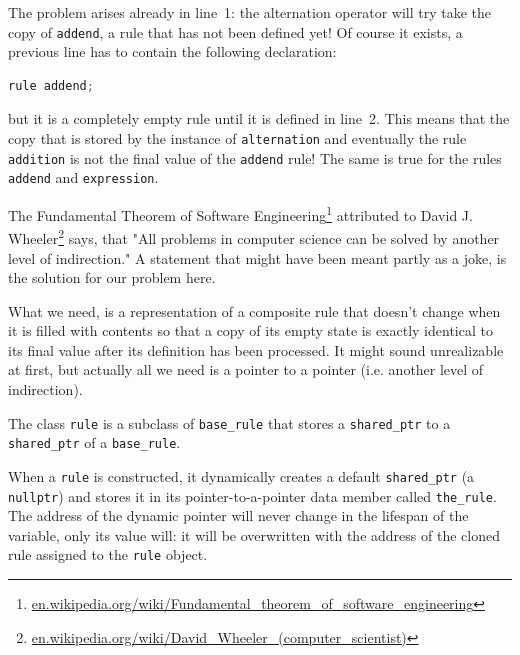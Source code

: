 \documentclass[12pt]{article}
\begin{document}
The problem arises already in line~1: the alternation operator will try take the copy of \texttt{addend},
a rule that has not been defined yet! Of course it exists, a previous line has to contain the following
declaration:

\begin{center}
	\begin{minipage}[h]{0.5\textwidth}
		\begin{lstlisting}[language=C++, breaklines=true]
rule addend;
		\end{lstlisting}
	\end{minipage}
\end{center}

but it is a completely empty rule until it is defined in line~2. This means that the copy that is stored by
the instance of \texttt{alternation} and eventually the rule \texttt{addition} is not the final value of the
\texttt{addend} rule! The same is true for the rules \texttt{addend} and \texttt{expression}.

The Fundamental Theorem of Software
Engineering\footnote{\href{http://en.wikipedia.org/wiki/Fundamental_theorem_of_software_engineering}{en.wikipedia.org/wiki/Fundamental\_theorem\_of\_software\_engineering}}
attributed to David J. Wheeler\footnote{
\href{http://en.wikipedia.org/wiki/David_Wheeler_(computer_scientist)}{en.wikipedia.org/wiki/David\_Wheeler\_(computer\_scientist)}}
says, that "All problems in computer science can be solved by another level of indirection." A statement
that might have been meant partly as a joke, is the solution for our problem here. 

What we need, is a representation of a composite rule that doesn't change when it is filled with contents so
that a copy of its empty state is exactly identical to its final value after its definition has been
processed. It might sound unrealizable at first, but actually all we need is a pointer to a pointer (i.e.
another level of indirection). 

The class \texttt{rule} is a subclass of \texttt{base\_rule} that stores a \texttt{shared\_ptr} to a
\texttt{shared\_ptr} of a \texttt{base\_rule}.

When a \texttt{rule} is constructed, it dynamically creates a default \texttt{shared\_ptr} (a
\texttt{nullptr}) and stores it in its pointer-to-a-pointer data member called \texttt{the\_rule}. The address
of the dynamic pointer will never change in the lifespan of the variable, only its value will: it will be
overwritten with the address of the cloned rule assigned to the \texttt{rule} object.
\end{document}
